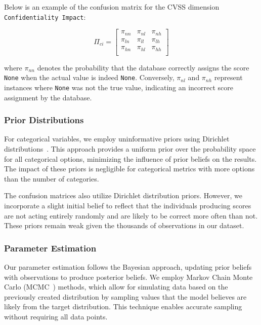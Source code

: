 \documentclass[12pt]{article}
\begin{document}
Below is an example of the confusion matrix for the CVSS dimension \texttt{Confidentiality Impact}:

\begin{equation}\label{confusion_matrix_formula}
	\Pi_{ci} = \begin{bmatrix}
		\pi_{nn} & \pi_{nl} & \pi_{nh} \\
		\pi_{ln} & \pi_{ll} & \pi_{lh} \\
		\pi_{hn} & \pi_{hl} & \pi_{hh} \\
	\end{bmatrix}
\end{equation}

where $\pi_{nn}$ denotes the probability that the database correctly assigns the score \texttt{None}
when the actual value is indeed \texttt{None}. Conversely, $\pi_{nl}$ and $\pi_{nh}$ represent
instances where \texttt{None} was not the true value, indicating an incorrect score assignment by
the database.

\subsubsection{Prior Distributions}

For categorical variables, we employ uninformative priors using Dirichlet distributions~\cite{dirichlet}. This
approach provides a uniform prior over the probability space for all categorical options, minimizing
the influence of prior beliefs on the results. The impact of these priors is negligible for
categorical metrics with more options than the number of categories.

The confusion matrices also utilize Dirichlet distribution priors. However, we incorporate a slight
initial belief to reflect that the individuals producing scores are not acting entirely randomly and
are likely to be correct more often than not. These priors remain weak given the thousands of
observations in our dataset.

\subsubsection{Parameter Estimation}

Our parameter estimation follows the Bayesian approach, updating prior beliefs with observations to
produce posterior beliefs. We employ Markov Chain Monte Carlo (MCMC~\cite{mcmc}) methods, which allow for
simulating data based on the previously created distribution by sampling values that the model
believes are likely from the target distribution. This technique enables accurate sampling without
requiring all data points.
\end{document}
